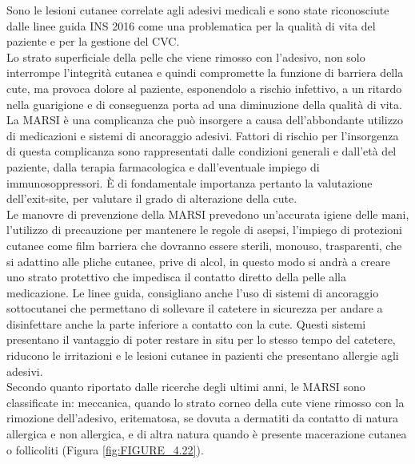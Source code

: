 Sono le lesioni cutanee correlate agli adesivi medicali e sono state riconosciute dalle linee guida INS 2016
come una problematica per la qualità di vita del paziente e per la gestione del CVC\cite{AIOMCVC}.\\
Lo strato superficiale della pelle che viene rimosso con l’adesivo, non solo interrompe l’integrità cutanea e quindi 
compromette la funzione di barriera della cute, ma provoca dolore al paziente, esponendolo a rischio infettivo, 
a un ritardo nella guarigione e di conseguenza porta ad una diminuzione della qualità di vita\cite{EMODIAL}.\\
La MARSI è una complicanza che può insorgere a causa dell’abbondante utilizzo di medicazioni e sistemi di ancoraggio 
adesivi. Fattori di rischio per l’insorgenza di questa complicanza sono rappresentati dalle condizioni generali e 
dall'età del paziente, dalla terapia farmacologica e dall’eventuale impiego di immunosoppressori. È di fondamentale 
importanza pertanto la valutazione dell’exit-site, per valutare il grado di alterazione della cute.\\ 
Le manovre di prevenzione della MARSI prevedono un’accurata igiene delle mani, l’utilizzo di precauzione per 
mantenere le regole di asepsi, l’impiego di protezioni cutanee come film barriera che dovranno essere sterili, 
monouso, trasparenti, che si adattino alle pliche cutanee, prive di alcol, in questo modo si andrà a creare uno 
strato protettivo che impedisca il contatto diretto della pelle alla medicazione. Le linee guida, consigliano anche 
l’uso di sistemi di ancoraggio sottocutanei che permettano di sollevare il catetere in sicurezza per andare a 
disinfettare anche la parte inferiore a contatto con la cute. Questi sistemi presentano il vantaggio di poter restare 
in situ per lo stesso tempo del catetere, riducono le irritazioni e le lesioni cutanee in pazienti che presentano 
allergie agli adesivi\cite{AIOMCVC}.\\
Secondo quanto riportato dalle ricerche degli ultimi anni, le MARSI sono classificate in:  meccanica, 
quando lo strato corneo della cute viene rimosso con la rimozione dell’adesivo, eritematosa, se dovuta a dermatiti da 
contatto di natura allergica e non allergica, e di altra natura quando è presente  macerazione cutanea o 
follicoliti (Figura \ref{fig:FIGURE_4.22})\cite{EMODIAL}.\\


